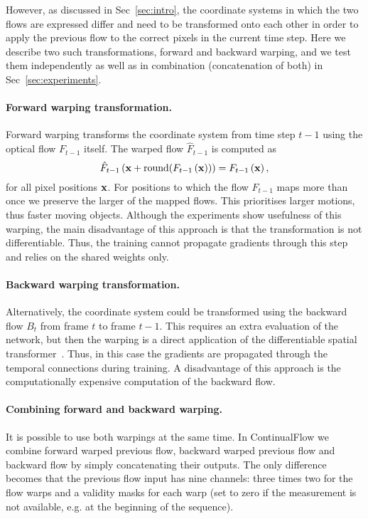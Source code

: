 \documentclass[runningheads]{llncs}
\begin{document}
However, as discussed in Sec~\ref{sec:intro}, the coordinate systems in which the two flows are expressed differ and need to be transformed onto each other in order to apply the previous flow to the correct pixels in the current time step.
Here we describe two such transformations, forward and backward warping, and we test them independently as well as in combination (concatenation of both) in Sec~\ref{sec:experiments}.

\paragraph{\bf\textbf{Forward warping transformation.}} Forward warping transforms the coordinate system from time step $t-1$ using the optical flow $F_{t-1}$ itself. The warped flow $\hat{F}_{t-1}$ is computed as
\begin{equation}
\hat{F}_{t-1}\left({\bf x} + \mbox{round}(F_{t-1}\left({\bf x}\right))\right) = F_{t-1}\left({\bf x}\right),
\end{equation}
for all pixel positions ${\bf x}$. For positions to which the flow $F_{t-1}$ maps more than once we preserve the larger of the mapped flows.
This prioritises larger motions, thus faster moving objects. Although the experiments show usefulness of this warping, the main disadvantage of this approach is that the transformation is not differentiable.
Thus, the training cannot propagate gradients through this step and relies on the shared weights only.

\paragraph{\bf\textbf{Backward warping transformation.}} Alternatively, the coordinate system could be transformed using the backward flow $B_t$ from frame $t$ to frame $t-1$.
This requires an extra evaluation of the network, but then the warping is a direct application of the differentiable spatial transformer~\cite{Jaderberg2015}.
Thus, in this case the gradients are propagated through the temporal connections during training.
A disadvantage of this approach is the computationally expensive computation of the backward flow.



\paragraph{\bf\textbf{Combining forward and backward warping.}} 
It is possible to use both warpings at the same time.
In ContinualFlow we combine forward warped previous flow, backward warped previous flow and backward flow by simply concatenating their outputs.
The only difference becomes that the previous flow input has nine channels: three times two for the flow warps and a validity masks for each warp (set to zero if the measurement is not available, e.g. at the beginning of the sequence).
\end{document}
